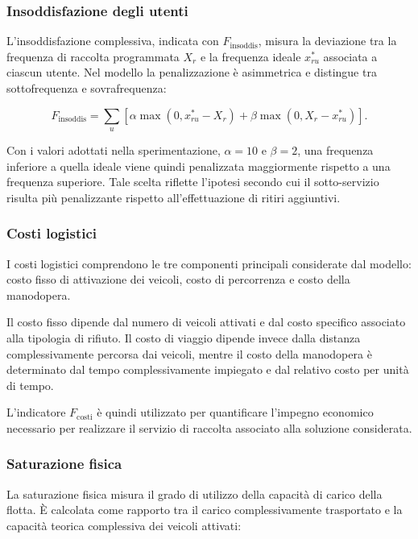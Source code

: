 \subsubsection{Insoddisfazione degli utenti}

L'insoddisfazione complessiva, indicata con $F_{\mathrm{insoddis}}$, misura la deviazione tra la frequenza di raccolta programmata $X_r$ e la frequenza ideale $x^*_{ru}$ associata a ciascun utente. Nel modello la penalizzazione è asimmetrica e distingue tra sottofrequenza e sovrafrequenza:

\[
F_{\mathrm{insoddis}}
=
\sum_u
\left[
\alpha \max(0,x^*_{ru}-X_r)
+
\beta \max(0,X_r-x^*_{ru})
\right].
\]

Con i valori adottati nella sperimentazione, $\alpha=10$ e $\beta=2$, una frequenza inferiore a quella ideale viene quindi penalizzata maggiormente rispetto a una frequenza superiore. Tale scelta riflette l'ipotesi secondo cui il sotto-servizio risulta più penalizzante rispetto all'effettuazione di ritiri aggiuntivi.

\subsubsection{Costi logistici}

I costi logistici comprendono le tre componenti principali considerate dal modello: costo fisso di attivazione dei veicoli, costo di percorrenza e costo della manodopera.

Il costo fisso dipende dal numero di veicoli attivati e dal costo specifico associato alla tipologia di rifiuto. Il costo di viaggio dipende invece dalla distanza complessivamente percorsa dai veicoli, mentre il costo della manodopera è determinato dal tempo complessivamente impiegato e dal relativo costo per unità di tempo.

L'indicatore $F_{\mathrm{costi}}$ è quindi utilizzato per quantificare l'impegno economico necessario per realizzare il servizio di raccolta associato alla soluzione considerata.

\subsubsection{Saturazione fisica}

La saturazione fisica misura il grado di utilizzo della capacità di carico della flotta. È calcolata come rapporto tra il carico complessivamente trasportato e la capacità teorica complessiva dei veicoli attivati:

